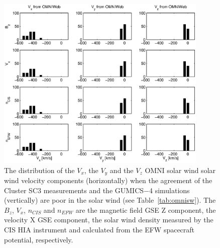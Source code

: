 \documentclass[linenumbers,draft]{agujournal}
\begin{document}
\begin{figure}[h]
\centering
\includegraphics[width=0.9\textwidth,angle=0]{swe-2020-corr-f14.eps}  
\caption{The distribution of the $V_{x}$, the $V_{y}$ and the $V_{z}$ OMNI solar wind solar wind velocity components (horizontally) when the agreement of the Cluster SC3 measurements and the GUMICS$-$4 simulations (vertically) are poor in the solar wind (see Table~\ref{tab:omnisw}). The $B_{z}$, $V_{x}$, $n_{CIS}$ and $n_{EFW}$ are the magnetic field GSE Z component, the velocity X GSE component, the solar wind density measured by the CIS HIA instrument and calculated from the EFW spacecraft potential, respectively.}
\label{fig:swomnivxyz}
\end{figure}

\pagebreak
\end{document}
